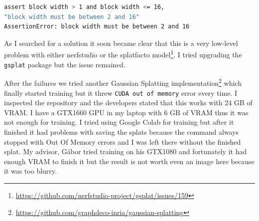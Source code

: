 \begin{lstlisting}[language=bash,frame=single,float=!ht]
assert block width > 1 and block width <= 16, 
"block width must be between 2 and 16"
AssertionError: block width must be between 2 and 16
\end{lstlisting}

As I searched for a solution it soon became clear that this is a very low-level problem with either nerfstudio or the splatfacto model\footnote{\url{https://github.com/nerfstudio-project/gsplat/issues/159}}. I tried upgrading the \verb|gsplat| package but the issue remained.

After the failures we tried another Gaussian Splatting implementation\footnote{\url{https://github.com/graphdeco-inria/gaussian-splatting}} which finally started training but it threw \verb|CUDA out of memory| error every time. I inspected the repository and the developers stated that this works with 24 GB of VRAM. I have a GTX1660 GPU in my laptop with 6 GB of VRAM thus it was not enough for training. I tried using Google Colab for training but after it finished it had problems with saving the splats because the command always stopped with Out Of Memory errors and I was left there without the finished splat. My advisor, Gábor tried training on his GTX1080 and fortunately it had enough VRAM to finish it but the result is not worth even an image here because it was too blurry.
